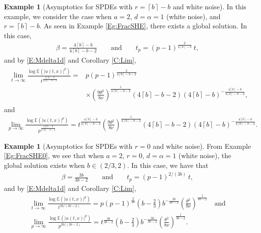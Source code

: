 \documentclass[a4paper,11pt]{article}
\numberwithin{equation}{section}
\numberwithin{equation}{section}
\theoremstyle{plain}
\theoremstyle{definition}
\newtheorem{example}[theorem]{Example}
\newcommand{\E}{\mathbb{E}}
\newcommand{\Ceil}[1]{\left\lceil #1 \right\rceil}
\begin{document}
\begin{example}[Asymptotics for SPDEs with $r=\Ceil{b}-b$ and white noise] \label{Eg:AsymFracSHE}
  In this example, we consider the case when $a=2$, $d=\alpha=1$ (white noise), and $r=\Ceil{b}-b$.
  As seen in Example \ref{Eg:FracSHE}, there exists a global solution. In this case,
  \begin{align*}
    \beta = \frac{4\Ceil{b}-b}{4\Ceil{b}-b-2} \qquad \text{and} \qquad
    t_p   = (p-1)^{\frac{2}{4\Ceil{b}-b}}\: t,
  \end{align*}
  and by \eqref{E:Mdelta1d} and Corollary \ref{C:Lim},
  \begin{align} \label{E:AsymFracSHE-t}
    \begin{aligned}
      \lim_{t \to \infty} \frac{\log \E\left(|u(t,x)|^p\right)}{t^{\frac{4\Ceil{b}-b}{4\Ceil{b}-b-2} }} =
      & p (p-1)^{\frac{2}{4\Ceil{b}-b-2}} \\
      & \times \left(\frac{9\theta^2}{8\nu}\right)^{\frac{1}{4 \Ceil{b}-b-2}} (4 \Ceil{b}-b-2) \left(4 \Ceil{b}-b\right)^{-\frac{4 \Ceil{b}-b}{4 \Ceil{b}-b-2}},
    \end{aligned}
  \end{align}
  and
  \begin{align} \label{E:AsymFracSHE-p}
    \lim_{p \to \infty} \frac{\log \E\left(|u(t,x)|^p\right)}{p^{\frac{4\Ceil{b}-b}{4\Ceil{b}-b-2} }}
    = t^{\frac{4\Ceil{b}-b}{4\Ceil{b}-b-2}}
      \left(\frac{9\theta^2}{8\nu}\right)^{\frac{1}{4 \Ceil{b}-b-2}} (4 \Ceil{b}-b-2) \left(4 \Ceil{b}-b\right)^{-\frac{4 \Ceil{b}-b}{4 \Ceil{b}-b-2}}.
  \end{align}
\end{example}

\begin{example}[Asymptotics for SPDEs with $r=0$ and white noise] \label{Eg:AymsFracSHE0}
  From Example \ref{Eg:FracSHE0}, we see that when $a=2$, $r=0$, $d=\alpha=1$ (white noise), the
  global solution exists when  $b\in (2 /3, 2)$. In this case, we have that
  \begin{align*}
    \beta = \frac{3b}{3b-2} \qquad \text{and} \qquad
    t_p   = (p-1)^{2 / (3b)}\: t,
  \end{align*}
  and by \eqref{E:Mdelta1d} and Corollary \ref{C:Lim},
  \begin{gather} \label{E:AsymFracSHE-t}
      \lim_{t \to \infty} \frac{\log \E\left(|u(t,x)|^p\right)}{t^{3b/(3b-2)}} =
      p (p-1)^{\frac{2}{3b}} \left(b-\frac{2}{3}\right) b^{-\frac{3 b}{3 b-2}} \left(\frac{\theta^2}{8\nu}\right)^{\frac{1}{3 b-2}}
      \quad \text{and}\\
    \label{E:AsymFracSHE-p}
    \lim_{p \to \infty} \frac{\log \E\left(|u(t,x)|^p\right)}{p^{3b/(3b-2)}} =
    t^{\frac{3b}{3b-2}}
    \left(b-\frac{2}{3}\right) b^{-\frac{3 b}{3 b-2}} \left(\frac{\theta^2}{8\nu}\right)^{\frac{1}{3 b-2}}.
  \end{gather}
\end{example}
\end{document}
